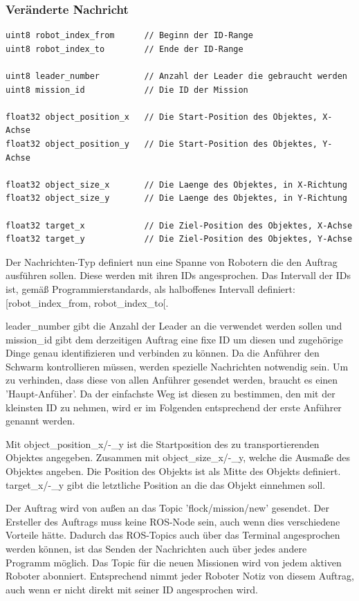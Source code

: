 \subsubsection*{Veränderte Nachricht}

\begin{lstlisting}[style=ros, title=Nachrichten-Typ: New\_Mission.msg]
uint8 robot_index_from		// Beginn der ID-Range
uint8 robot_index_to		// Ende der ID-Range

uint8 leader_number			// Anzahl der Leader die gebraucht werden
uint8 mission_id			// Die ID der Mission

float32 object_position_x	// Die Start-Position des Objektes, X-Achse
float32 object_position_y	// Die Start-Position des Objektes, Y-Achse

float32 object_size_x		// Die Laenge des Objektes, in X-Richtung
float32 object_size_y		// Die Laenge des Objektes, in Y-Richtung

float32 target_x			// Die Ziel-Position des Objektes, X-Achse
float32 target_y			// Die Ziel-Position des Objektes, Y-Achse
\end{lstlisting}

Der Nachrichten-Typ definiert nun eine Spanne von Robotern die den Auftrag ausführen sollen. Diese werden mit ihren IDs angesprochen. Das Intervall der IDs ist, gemäß Programmierstandards, als halboffenes Intervall definiert: [robot\_index\_from, robot\_index\_to[.

leader\_number gibt die Anzahl der Leader an die verwendet werden sollen und mission\_id gibt dem derzeitigen Auftrag eine fixe ID um diesen und zugehörige Dinge genau identifizieren und verbinden zu können. Da die Anführer den Schwarm kontrollieren müssen, werden spezielle Nachrichten notwendig sein. Um zu verhinden, dass diese von allen Anführer gesendet werden, braucht es einen 'Haupt-Anfüher'. Da der einfachste Weg ist diesen zu bestimmen, den mit der kleinsten ID zu nehmen, wird er im Folgenden entsprechend der erste Anführer genannt werden.

Mit object\_position\_x/-\_y ist die Startposition des zu transportierenden Objektes angegeben. Zusammen mit object\_size\_x/-\_y, welche die Ausmaße des Objektes angeben. Die Position des Objekts ist als Mitte des Objekts definiert.
target\_x/-\_y gibt die letztliche Position an die das Objekt einnehmen soll.

Der Auftrag wird von außen an das Topic 'flock/mission/new' gesendet. Der Ersteller des Auftrags muss keine \ac{ROS}-Node sein, auch wenn dies verschiedene Vorteile hätte. Dadurch das \ac{ROS}-Topics auch über das Terminal angesprochen werden können, ist das Senden der Nachrichten auch über jedes andere Programm möglich. Das Topic für die neuen Missionen wird von jedem aktiven Roboter abonniert. Entsprechend nimmt jeder Roboter Notiz von diesem Auftrag, auch wenn er nicht direkt mit seiner ID angesprochen wird.\\


